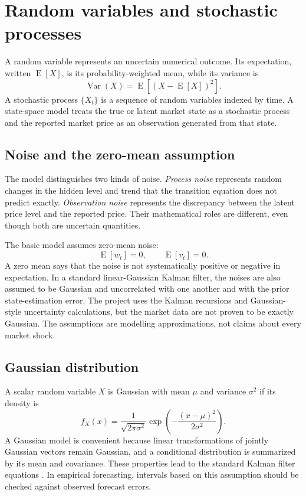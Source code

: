 \documentclass[12pt,a4paper,oneside]{report}
\numberwithin{equation}{chapter}
\numberwithin{figure}{chapter}
\numberwithin{table}{chapter}
\theoremstyle{definition}
\theoremstyle{plain}
\DeclareMathOperator{\Var}{Var}
\DeclareMathOperator{\E}{E}
\newcommand{\1}{\mathbf{1}}
\begin{document}
\section{Random variables and stochastic processes}
A random variable represents an uncertain numerical outcome. Its expectation, written $\E[X]$, is its probability-weighted mean, while its variance is
\begin{equation}
  \Var(X)=\E\left[(X-\E[X])^2\right].
\end{equation}
A stochastic process $\{X_t\}$ is a sequence of random variables indexed by time. A state-space model treats the true or latent market state as a stochastic process and the reported market price as an observation generated from that state.

\subsection{Noise and the zero-mean assumption}
The model distinguishes two kinds of noise. \emph{Process noise} represents random changes in the hidden level and trend that the transition equation does not predict exactly. \emph{Observation noise} represents the discrepancy between the latent price level and the reported price. Their mathematical roles are different, even though both are uncertain quantities.

The basic model assumes zero-mean noise:
\[
  \E[w_t]=0,\qquad \E[v_t]=0.
\]
A zero mean says that the noise is not systematically positive or negative in expectation. In a standard linear-Gaussian Kalman filter, the noises are also assumed to be Gaussian and uncorrelated with one another and with the prior state-estimation error. The project uses the Kalman recursions and Gaussian-style uncertainty calculations, but the market data are not proven to be exactly Gaussian. The assumptions are modelling approximations, not claims about every market shock.

\subsection{Gaussian distribution}
A scalar random variable $X$ is Gaussian with mean $\mu$ and variance $\sigma^2$ if its density is
\[
  f_X(x)=\frac{1}{\sqrt{2\pi\sigma^2}}
  \exp\left(-\frac{(x-\mu)^2}{2\sigma^2}\right).
\]
A Gaussian model is convenient because linear transformations of jointly Gaussian vectors remain Gaussian, and a conditional distribution is summarized by its mean and covariance. These properties lead to the standard Kalman filter equations \cite{kalman1960,welch2006}. In empirical forecasting, intervals based on this assumption should be checked against observed forecast errors.
\end{document}
